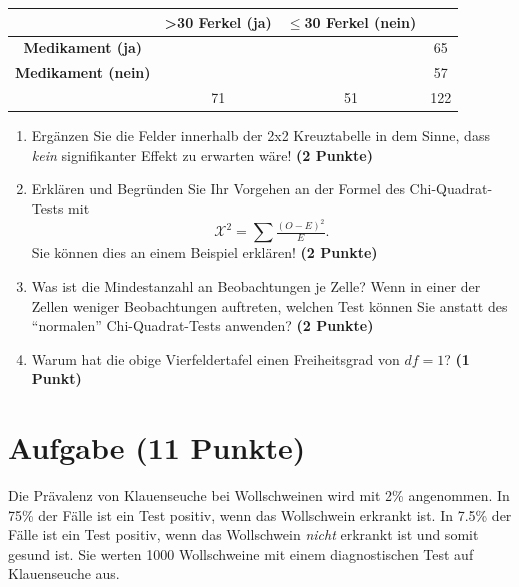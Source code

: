 \documentclass[a4paper, 10pt]{scrartcl}\usepackage[]{graphicx}\usepackage[]{xcolor}
\begin{document}
\vspace{5Ex}

\begin{center}
  \Large
  \begin{tabular}{c|c|c|c}
     & \textbf{>30 Ferkel (ja)} & \textbf{$\leq$30 Ferkel (nein)} &  \strut\\
    \hline
    \textbf{Medikament (ja)} & \phantom{100}  & \phantom{100}  &   65  \strut\\
    \hline
    \textbf{Medikament (nein)} & \phantom{100}  & \phantom{100}  &   57   \strut\\
    \hline
     &  71 &  51 &  122  \strut\\
  \end{tabular}
\end{center}



\vspace{5Ex}

\begin{enumerate}
\item Erg{\"a}nzen Sie die Felder innerhalb der 2x2 Kreuztabelle in dem Sinne,
  dass \textit{kein} signifikanter Effekt zu erwarten w{\"a}re!
  \textbf{(2 Punkte)}
\item Erkl{\"a}ren und Begr{\"u}nden Sie Ihr Vorgehen an der Formel des
  Chi-Quadrat-Tests mit
  \begin{equation*}
  \mathcal{X}^2 = \sum\tfrac{(O - E)^2}{E}.  
  \end{equation*}
  Sie k{\"o}nnen dies an einem Beispiel erkl{\"a}ren! \textbf{(2 Punkte)}
\item Was ist die Mindestanzahl an Beobachtungen je Zelle? Wenn in einer
  der Zellen weniger Beobachtungen auftreten, welchen Test k{\"o}nnen Sie
  anstatt des "`normalen"' Chi-Quadrat-Tests anwenden? \textbf{(2 Punkte)}
\item Warum hat die obige Vierfeldertafel einen Freiheitsgrad von $df=1$?
  \textbf{(1 Punkt)}
\end{enumerate} 
\clearpage

\section{Aufgabe \hfill (11 Punkte)}

Die Pr{\"a}valenz von Klauenseuche bei Wollschweinen wird mit
2\% angenommen. In 75\% der F{\"a}lle ist ein Test positiv, wenn das Wollschwein erkrankt
ist. In 7.5\% der F{\"a}lle ist ein Test positiv,
wenn das Wollschwein \textit{nicht} erkrankt ist und somit gesund ist. Sie
werten 1000 Wollschweine mit einem
diagnostischen Test auf Klauenseuche aus.
\end{document}
